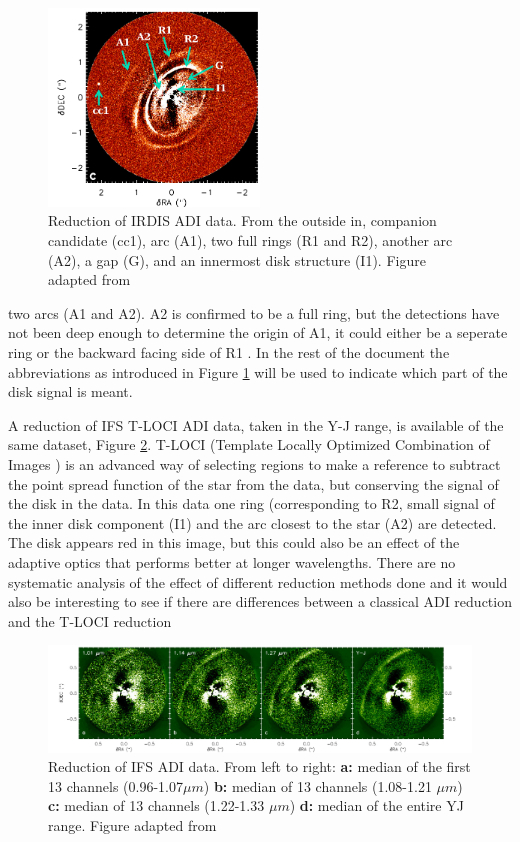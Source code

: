 \documentclass[twoside,single]{lion-msc}
\begin{document}
\begin{figure}
\includegraphics[width = 0.5\textwidth]{irdisjos}
\caption{Reduction of IRDIS ADI data. From the outside in, companion candidate (cc1), arc (A1), two full rings (R1 and R2), another arc (A2), a gap (G), and an innermost disk structure (I1). Figure adapted from \citep{DeBoer2016}}
\label{fig:irdisjos}
\vspace{-7mm}
\end{figure}

\noindent
two arcs (A1 and A2). A2 is confirmed to be a full ring, but the detections have not been deep enough to determine the origin of A1, it could either be a seperate ring or the backward facing side of R1 \citep{DeBoer2016}. In the rest of the document the abbreviations as introduced in Figure \ref{fig:irdisjos} will be used to indicate which part of the disk signal is meant.
\bigskip

A reduction of IFS T-LOCI ADI data, taken in the Y-J range, is available of the same dataset, Figure \ref{fig:ifsjos}. T-LOCI (Template Locally Optimized Combination of Images \citep{Marois2010}) is an advanced way of selecting regions to make a reference to subtract the point spread function of the star from the data, but conserving the signal of the disk in the data. In this data one ring (corresponding to R2, small signal of the inner disk component (I1) and the arc closest to the star (A2) are detected. The disk appears red in this image, but this could also be an effect of the adaptive optics that performs better at longer wavelengths. There are no systematic analysis of the effect of different reduction methods done and it would also be interesting to see if there are differences between a classical ADI reduction and the T-LOCI reduction

\begin{figure}[ht]
\includegraphics[width = \textwidth]{ifsjos}
\caption{Reduction of IFS ADI data. From left to right: \textbf{a:} median of the first 13 channels (0.96-1.07$\mu m$) \textbf{b:} median of 13 channels (1.08-1.21 $\mu m$) \textbf{c:} median of 13 channels (1.22-1.33 $\mu m$) \textbf{d:} median of the entire YJ range. Figure adapted from \citep{DeBoer2016}}
\label{fig:ifsjos}
\end{figure}
\end{document}
